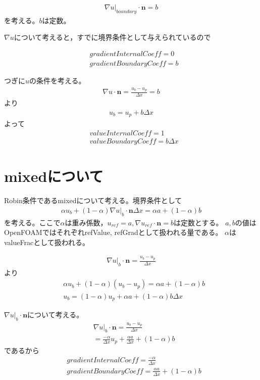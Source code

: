 \documentclass[a4paper,fleqn]{jsarticle}
\begin{document}
\begin{align}
 \nabla u|_{boundary} \cdot \bm{n}=b
\end{align}
を考える。$b$は定数。

$\nabla u$について考えると，すでに境界条件として与えられているので

\begin{align}
& gradientInternalCoeff=0 \\
& gradientBoundaryCoeff=b
\end{align}

つぎに$u$の条件を考える。
\begin{align}
 \nabla u\cdot \bm{n}=\frac{u_b-u_p}{\Delta x}=b
\end{align}
より
\begin{align}
 u_b=u_p+b\Delta x
\end{align}
よって
\begin{align}
& valueInternalCoeff=1 \\
& valueBoundaryCoeff=b\Delta x 
\end{align}


\section{mixedについて}
Robin条件であるmixedについて考える。境界条件として
\begin{align}
 \alpha u_b +(1-\alpha)\nabla u|_b \cdot \bm{n} \Delta x=\alpha a + (1-\alpha)b
\end{align}
を考える。ここで$\alpha$は重み係数，$u_{ref}=a,\nabla u_{ref}\cdot \bm{n}=b$は定数とする。
$a,b$の値はOpenFOAMではそれぞれrefValue, refGradとして扱われる量である。
$\alpha$はvalueFracとして扱われる。

\begin{align}
 \nabla u|_b\cdot \bm{n}=\frac{u_b-u_p}{\Delta x}
\end{align}
より
\begin{align}
 & \alpha u_b+(1-\alpha)(u_b-u_p)=\alpha a+(1-\alpha)b \\
 & u_b=(1-\alpha)u_p+\alpha a +(1-\alpha)b\Delta x \label{eq:mixed}
\end{align}

$\nabla u|_b \cdot \bm{n}$について考える。
\begin{align}
 & \nabla u|_b \cdot \bm{n}=\frac{u_b-u_p}{\Delta x} \\
 & =\frac{-\alpha}{\Delta x}u_p +\frac{\alpha a}{\Delta x} +(1-\alpha)b
\end{align}
であるから
\begin{align}
& gradientInternalCoeff=\frac{-\alpha}{\Delta x}\\
& gradientBoundaryCoeff=\frac{\alpha a}{\Delta x} +(1-\alpha)b
\end{align}
\end{document}
